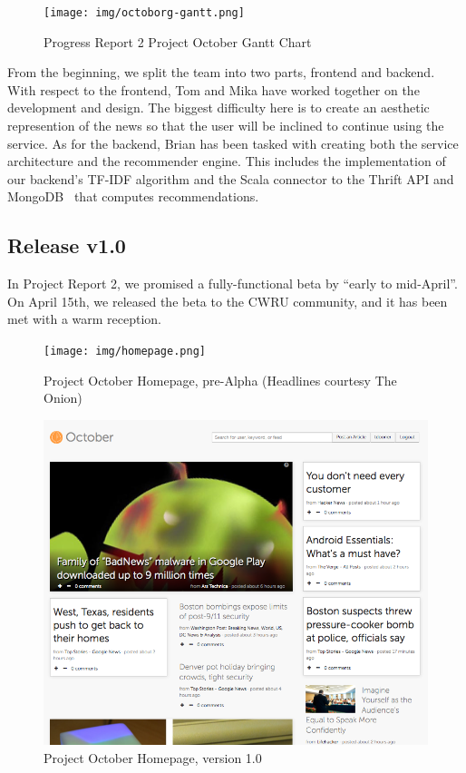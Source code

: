 \documentclass[11pt,letterpaper,titlepage]{article}
\begin{document}
\begin{figure}
\centering
\texttt{[image: img/octoborg-gantt.png]}
\caption{Progress Report 2 Project October Gantt Chart}
\label{fig:gantt}
\end{figure}

From the beginning, we split the team into two parts, frontend and backend.
With respect to the frontend, Tom and Mika have worked together on the development and design.
The biggest difficulty here is to create an aesthetic represention of the news so that the user will be inclined to continue using the service.
As for the backend, Brian has been tasked with creating both the service architecture and the recommender engine.
This includes the implementation of our backend's TF-IDF algorithm and the Scala
connector to the Thrift API and MongoDB~\cite{mongodb} that computes recommendations.

\subsection{Release v1.0}
\label{sec:release1.0}
In Project Report 2, we promised a fully-functional beta by ``early to mid-April''.
On April 15th, we released the beta to the CWRU community, and it has been met with a warm reception.

\begin{figure}
\centering
\texttt{[image: img/homepage.png]}
\caption{Project October Homepage, pre-Alpha (Headlines courtesy The Onion)}
\label{fig:homepage}
\end{figure}

\begin{figure}
\centering
\includegraphics[scale=0.6]{img/homepage-v1.png}
\caption{Project October Homepage, version 1.0}
\label{fig:homepage-v1.0}
\end{figure}
\end{document}
